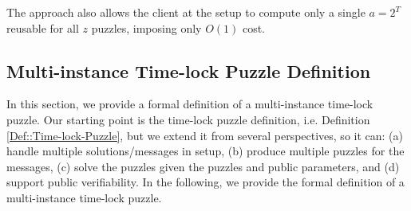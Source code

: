     The approach also allows  the client at the setup to compute only a single $a=2^{\scriptscriptstyle T}$  reusable for all $z$ puzzles, imposing only $O(1)$  cost. 


\subsection{Multi-instance   Time-lock Puzzle Definition}\label{Section::Multi-instance-Time-lock Puzzle-Definition}


In this section, we provide a formal definition of a multi-instance time-lock puzzle. Our starting point is the  time-lock puzzle definition, i.e. Definition \ref{Def::Time-lock-Puzzle}, but we extend it from several  perspectives, so it can: (a) handle multiple  solutions/messages in setup, (b)  produce multiple puzzles for the messages,   (c) solve the puzzles given the puzzles and public parameters, and (d) support public verifiability. In the following, we provide the formal definition of a multi-instance  time-lock puzzle.
